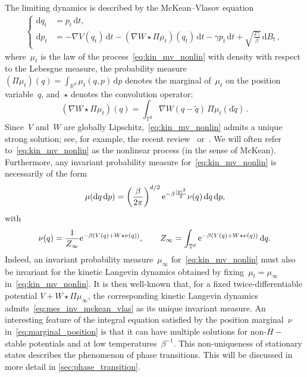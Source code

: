 \documentclass[onefignum,onetabnum]{siamart251216} %
\renewcommand{\d}{\mathrm{d}}
\newcommand{\torus}{\mathbb T}
\newcommand{\real}{\mathbb R}
\newcommand{\ee}{{\rm e}}
\newcommand{\mescin}{\mu}
\newcommand{\mespos}{\nu}
\newcommand{\projp}{\Pi}
\theoremstyle{plain}
\numberwithin{equation}{section}
\numberwithin{theorem}{section}
\begin{document}
The limiting dynamics is described by the McKean--Vlasov equation
\begin{align}
    \label{eq:kin_mv_nonlin}
    \left\{
\begin{aligned}
    \d q_t &= \displaystyle p_t \,\d t, \\
    \d p_t &= \displaystyle -\nabla V(q_t) \,\d t - (\nabla W \star \Pi \mescin_t )(q_t)\,\d t -\gamma p_t \,\d t +\sqrt{\frac{2\gamma}{\beta}}\,\d B_t \, ,
\end{aligned}
    \right.
\end{align}
where~$\mescin_t$ is the law of the process~\eqref{eq:kin_mv_nonlin} with density with respect to the Lebesgue measure,
the probability measure $(\projp\mescin_t)(q)= \int_{\real^{d}} \mescin_t(q,p)\,\d p$ denotes the marginal of~$\mu_t$ on the position variable~$q$,
and~$\star$ denotes the convolution operator:
\[
    (\nabla W \star \Pi \mescin_t)(q)
    = \int_{\torus^d} \nabla W(q - \widetilde q) \, \Pi \mescin_t(\d \widetilde q) \, .
\]
Since~$V$ and~$W$ are globally Lipschitz,~\eqref{eq:kin_mv_nonlin} admits a unique strong solution; see, for example, the recent review~\cite[Proposition 1]{chaintron2022propagationI} or~\cite[Theorem 1.7]{carmona2016lectures}. We will often refer to~\eqref{eq:kin_mv_nonlin} as the nonlinear process (in the sense of McKean). Furthermore, any invariant probability measure for~\eqref{eq:kin_mv_nonlin} is necessarily of the form~\cite{dressler1987stationary, duong2016stationary}
\begin{align}
    \label{eq:mes_inv_mckean_vlas}
    \mescin(\d q\,\d p) = \left(\frac{\beta}{2\pi}\right)^{d/2} \ee^{-\beta \frac{|p|^2}{2}} \mespos(q)\,\d q\,\d p,
\end{align}
with
\begin{align}
    \label{eq:marginal_position}
    \mespos(q) = \frac{1}{Z_\infty}\ee^{-\beta(V(q)+W\star \mespos(q))}, \qquad Z_\infty = \int_{\torus^d} \ee^{-\beta(V(q)+W\star \mespos(q))}\,\d q.
\end{align}
Indeed, an invariant probability measure~$\mescin_{\infty}$ for~\eqref{eq:kin_mv_nonlin} must also be invariant for the kinetic Langevin dynamics obtained by fixing~$\mescin_t = \mescin_{\infty}$ in~\eqref{eq:kin_mv_nonlin}.
It is then well-known that, for a fixed twice-differentiable potential $V + W \star \projp \mescin_{\infty}$,
the corresponding kinetic Langevin dynamics admits~\eqref{eq:mes_inv_mckean_vlas} as its unique invariant measure.
An interesting feature of the integral equation satisfied by the position marginal~$\nu$ in~\eqref{eq:marginal_position} is that it can have multiple solutions for non-$H-$stable potentials and at low temperatures~$\beta^{-1}$. This non-uniqueness of stationary states describes the phenomenon of phase transitions. This will be discussed in more detail in \cref{sec:phase_transition}.
\end{document}
